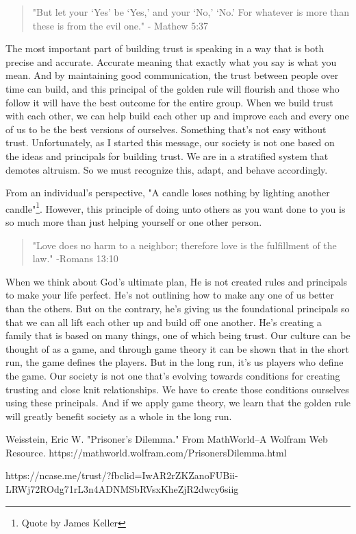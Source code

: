 \documentclass[10pt]{article}
\begin{document}
\begin{multicols}{2}
\begin{quotation}
"But let your ‘Yes’ be ‘Yes,’ and your ‘No,’ ‘No.’ For whatever is more than these is from the evil one." - Mathew 5:37
\end{quotation}

The most important part of building trust is speaking in a way that is both precise and accurate. Accurate meaning that exactly what you say is what you mean. And by maintaining good communication, the trust between people over time can build, and this principal of the golden rule will flourish and those who follow it will have the best outcome for the entire group. When we build trust with each other, we can help build each other up and improve each and every one of us to be the best versions of ourselves. Something that's not easy without trust. Unfortunately, as I started this message, our society is not one based on the ideas and principals for building trust. We are in a stratified system that demotes altruism. So we must recognize this, adapt, and behave accordingly.

From an individual's perspective, "A candle loses nothing by lighting another candle"\footnote{Quote by James Keller}. However, this principle of doing unto others as you want done to you is so much more than just helping yourself or one other person.

\begin{quotation}
"Love does no harm to a neighbor; therefore love is the fulfillment of the law." -Romans 13:10
\end{quotation}

When we think about God's ultimate plan, He is not created rules and principals to make your life perfect. He's not outlining how to make any one of us better than the others. But on the contrary, he's giving us the foundational principals so that we can all lift each other up and build off one another. He's creating a family that is based on many things, one of which being trust. Our culture can be thought of as a game, and through game theory it can be shown that in the short run, the game defines the players. But in the long run, it's us players who define the game. Our society is not one that's evolving towards conditions for creating trusting and close knit relationships. We have to create those conditions ourselves using these principals. And if we apply game theory, we learn that the golden rule will greatly benefit society as a whole in the long run.

\begin{thebibliography}{9}
	{\footnotesize
	  Weisstein, Eric W. "Prisoner's Dilemma." From MathWorld--A Wolfram Web Resource. https://mathworld.wolfram.com/PrisonersDilemma.html 
	
	 https://ncase.me/trust/?fbclid=IwAR2rZKZanoFUBii-LRWj72ROdg71rL3n4ADNMSbRVsxKheZjR2dwcy6siig
	}
\end{thebibliography}

\end{multicols}


\end{document}
